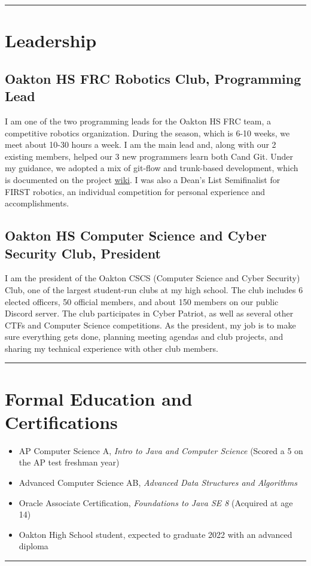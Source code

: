 \documentclass[10pt,letterpaper]{article}
\def\link#1#2{\color{blue!60!black}\href{#1}{#2}\color{black}}
\newcommand{\CPP}
{C\nolinebreak[4]\hspace{-.05em}\raisebox{.35ex}{\footnotesize\bf ++}}
\def\paddedItem#1{\vspace{-0.4em}\item #1}
\begin{document}
    \hrule
    \vspace{-0.4em}

    \section*{Leadership}
    \subsection*{Oakton HS FRC Robotics Club, Programming Lead}

    I am one of the two programming leads for the Oakton HS FRC team,
    a competitive robotics organization.
    During the season, which is 6-10 weeks, we meet about 10-30 hours a week.
    I am the main lead and, along with our 2 existing members,
    helped our 3 new programmers learn both \CPP and Git.
    Under my guidance, we adopted a mix of git-flow and trunk-based development,
    which is documented on the project \link{https://github.com/CougarProgramming623/InfiniteRecharge/wiki/Git}{wiki}.
    I was also a Dean's List Semifinalist for FIRST robotics,
    an individual competition for personal experience and accomplishments.

    \subsection*{Oakton HS Computer Science and Cyber Security Club, President}

    I am the president of the Oakton CSCS (Computer Science and Cyber Security) Club,
    one of the largest student-run clubs at my high school. 
    The club includes 6 elected officers, 50 official members, and about 150 members on our public Discord server.
    The club participates in Cyber Patriot, as well as several other CTFs and Computer Science competitions.
    As the president, my job is to make sure everything gets done, planning meeting agendas and club projects,
    and sharing my technical experience with other club members. 

    \vspace{1em}
    \hrule

    \section*{Formal Education and Certifications}
    \begin{itemize}
        \paddedItem AP Computer Science A, \textit{Intro to Java and Computer Science}  (Scored a 5 on the AP test freshman year)
        \paddedItem Advanced Computer Science AB, \textit{Advanced Data Structures and Algorithms}
        \paddedItem Oracle Associate Certification, \textit{Foundations to Java SE 8} (Acquired at age 14)
        \paddedItem Oakton High School student, expected to graduate 2022 with an advanced diploma
    \end{itemize}
    \vspace{0.3em}
    \hrule
    
\end{document}
